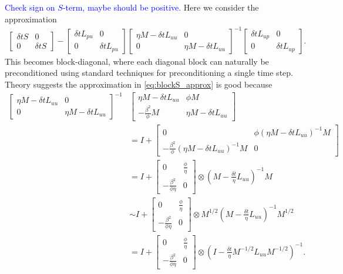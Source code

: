 \documentclass[a4paper,10pt]{article}
\newcommand{\tcb}{\textcolor{blue}}
\begin{document}
%
\tcb{Check sign on $S$-term, maybe should be positive.} Here we consider
the approximation
%
\begin{align}\label{eq:blockS_approx}
\begin{bmatrix} \delta tS & 0 \\ 0 & \delta tS\end{bmatrix} 
	- \begin{bmatrix} \delta tL_{pu} & 0 \\ 0 & \delta tL_{pu}\end{bmatrix}
	\begin{bmatrix} \eta M - \delta tL_{uu} & 0 \\
		0 & \eta M - \delta tL_{uu} \end{bmatrix}^{-1}
	\begin{bmatrix} \delta tL_{up} & 0 \\ 0 & \delta tL_{up} \end{bmatrix}.
\end{align}
%
This becomes block-diagonal, where each diagonal block can naturally be
preconditioned using standard techniques for preconditioning a single
time step. Theory suggests the approximation in \eqref{eq:blockS_approx}
is good because
%
\begin{align}\label{eq:diag_prec}
\begin{bmatrix} \eta M - \delta tL_{uu} & 0 \\
		0 & \eta M - \delta tL_{uu} \end{bmatrix}^{-1}&
		\begin{bmatrix} \eta M - \delta tL_{uu} & \phi M \\
		-\frac{\beta^2}{\phi}M & \eta M - \delta tL_{uu} \end{bmatrix} \\
& = I + \begin{bmatrix} 0 & \phi(\eta M - \delta tL_{uu})^{-1} M \nonumber\\
		-\frac{\beta^2}{\phi}(\eta M - \delta tL_{uu})^{-1}M & 0 \end{bmatrix} \\
& = I + \begin{bmatrix} 0 & \frac{\phi}{\eta} \\ -\frac{\beta^2}{\phi\eta} & 0 \end{bmatrix}
	\otimes \left( M - \tfrac{\delta t}{\eta} L_{uu}\right)^{-1}M \nonumber\\
& \sim I + \begin{bmatrix} 0 & \frac{\phi}{\eta} \\ -\frac{\beta^2}{\phi\eta} & 0 \end{bmatrix}
	\otimes M^{1/2}\left( M - \tfrac{\delta t}{\eta} L_{uu}\right)^{-1}M^{1/2} \nonumber\\
& = I + \begin{bmatrix} 0 & \frac{\phi}{\eta} \\ -\frac{\beta^2}{\phi\eta} & 0 \end{bmatrix}
	\otimes \left( I - \tfrac{\delta t}{\eta} M^{-1/2}L_{uu}M^{-1/2}\right)^{-1}.\nonumber
\end{align}
\end{document}

